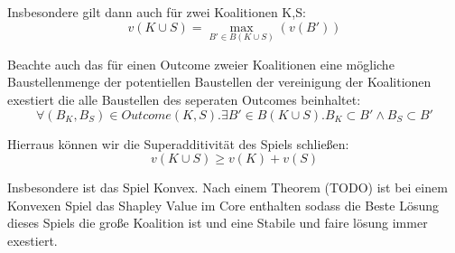 \documentclass[12pt]{article}
\theoremstyle{break}
\begin{document}
Insbesondere gilt dann auch für zwei Koalitionen K,S:
\begin{equation}
  v(K\cup S) = \max_{B'\in B(K\cup S)}(v(B'))
\end{equation}

Beachte auch das für einen Outcome zweier Koalitionen eine mögliche Baustellenmenge der potentiellen Baustellen der vereinigung der Koalitionen exestiert die alle Baustellen des seperaten Outcomes beinhaltet:
\begin{equation}
  \forall (B_K, B_S)\in Outcome(K,S).\exists B'\in B(K\cup S).B_K\subset B'\land B_S\subset B'
\end{equation}

Hierraus können wir die Superadditivität des Spiels schließen:
\begin{equation}
  v(K\cup S) \geq v(K) + v(S)
\end{equation}


Insbesondere ist das Spiel Konvex.
Nach einem Theorem (TODO) ist bei einem Konvexen Spiel das Shapley Value im Core enthalten sodass die Beste Lösung dieses Spiels die große Koalition ist und eine Stabile und faire lösung immer exestiert.





%
%
%
\end{document}
